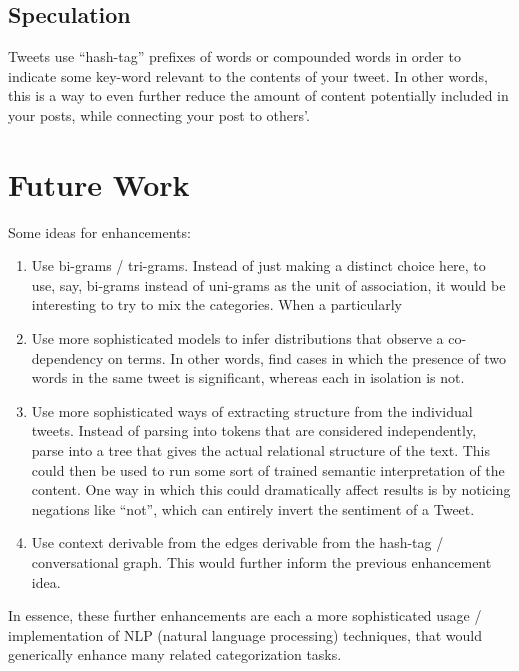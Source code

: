 \documentclass[12pt,a4paper]{article}
\begin{document}

\subsection { Speculation }


Tweets use ``hash-tag'' prefixes of words or compounded words in order to indicate some key-word relevant to the contents of your tweet.  In other words, this is a way to even further reduce the amount of content potentially included in your posts, while connecting your post to others'.


\section { Future Work}

Some ideas for enhancements:

\begin{enumerate}[1)]
\item Use bi-grams / tri-grams.  Instead of just making a distinct choice here, to use, say, bi-grams instead of uni-grams as the unit of association, it would be interesting to try to mix the categories.  When a particularly 

\item Use more sophisticated models to infer distributions that observe a co-dependency on terms.  In other words, find cases in which the presence of two words in the same tweet is significant, whereas each in isolation is not.

\item Use more sophisticated ways of extracting structure from the individual tweets.  Instead of parsing into tokens that are considered independently, parse into a tree that gives the actual relational structure of the text.  This could then be used to run some sort of trained semantic interpretation of the content.  One way in which this could dramatically affect results is by noticing negations like ``not'', which can entirely invert the sentiment of a Tweet.

\item Use context derivable from the edges derivable from the hash-tag / conversational graph.  This would further inform the previous enhancement idea.
\end{enumerate}

In essence, these further enhancements are each a more sophisticated usage / implementation of NLP (natural language processing) techniques, that would generically enhance many related categorization tasks.
\end{document}
